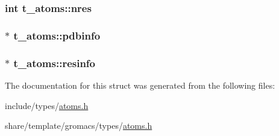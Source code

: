 \hypertarget{structt__atoms_a22eaee982f6e5be974be4d49f0d90745}{
\subsubsection[{nres}]{\setlength{\rightskip}{0pt plus 5cm}int {\bf t\-\_\-atoms\-::nres}}}\label{structt__atoms_a22eaee982f6e5be974be4d49f0d90745}
\hypertarget{structt__atoms_a97d641cab3bc0c5a3d78c800f45201e1}{
\subsubsection[{pdbinfo}]{ $\ast$ {\bf t\-\_\-atoms\-::pdbinfo}}}\label{structt__atoms_a97d641cab3bc0c5a3d78c800f45201e1}
\hypertarget{structt__atoms_a1ef118b1571b8f575d9ee1cf720ae513}{
\subsubsection[{resinfo}]{ $\ast$ {\bf t\-\_\-atoms\-::resinfo}}}\label{structt__atoms_a1ef118b1571b8f575d9ee1cf720ae513}


\-The documentation for this struct was generated from the following files\-:\begin{DoxyCompactItemize}
\item 
include/types/\hyperlink{include_2types_2atoms_8h}{atoms.\-h}\item 
share/template/gromacs/types/\hyperlink{share_2template_2gromacs_2types_2atoms_8h}{atoms.\-h}\end{DoxyCompactItemize}
